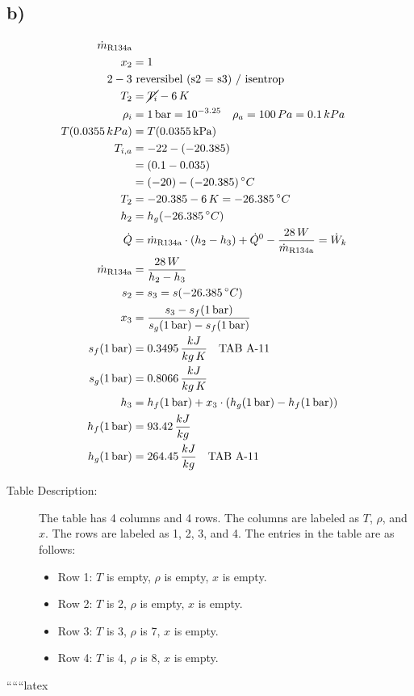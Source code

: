 

\subsection*{b)}

\begin{align*}
    \dot{m}_{\text{R134a}} \\
    x_2 &= 1 \\
    2-3 &\text{ reversibel (s2 = s3) / isentrop} \\
    T_2 &= \cancel{T_i} - 6\,K \\
    \rho_i &= 1\,\text{bar} = 10^{-3.25} \quad \rho_a = 100\,Pa = 0.1\,kPa \\
    T(0.0355\,kPa) &= T(0.0355\,\text{kPa}) \\
    T_{i,a} &= -22 - (-20.385) \\
    &= (0.1 - 0.035) \\
    &= (-20) - (-20.385)\,^\circ C \\
    T_2 &= -20.385 - 6\,K = -26.385\,^\circ C \\
    h_2 &= h_g(-26.385\,^\circ C) \\
    \dot{Q} &= \dot{m}_{\text{R134a}} \cdot (h_2 - h_3) + \dot{Q}^0 - \frac{28\,W}{\dot{m}_{\text{R134a}}} = \dot{W}_k \\
    \dot{m}_{\text{R134a}} &= \frac{28\,W}{h_2 - h_3} \\
    s_2 &= s_3 = s(-26.385\,^\circ C) \\
    x_3 &= \frac{s_3 - s_f(1\,\text{bar})}{s_g(1\,\text{bar}) - s_f(1\,\text{bar})} \\
    s_f(1\,\text{bar}) &= 0.3495\,\frac{kJ}{kg\,K} \quad \text{TAB A-11} \\
    s_g(1\,\text{bar}) &= 0.8066\,\frac{kJ}{kg\,K} \\
    h_3 &= h_f(1\,\text{bar}) + x_3 \cdot \left( h_g(1\,\text{bar}) - h_f(1\,\text{bar}) \right) \\
    h_f(1\,\text{bar}) &= 93.42\,\frac{kJ}{kg} \\
    h_g(1\,\text{bar}) &= 264.45\,\frac{kJ}{kg} \quad \text{TAB A-11}
\end{align*}

\begin{description}
    \item[Table Description:] The table has 4 columns and 4 rows. The columns are labeled as $T$, $\rho$, and $x$. The rows are labeled as 1, 2, 3, and 4. The entries in the table are as follows:
    \begin{itemize}
        \item Row 1: $T$ is empty, $\rho$ is empty, $x$ is empty.
        \item Row 2: $T$ is 2, $\rho$ is empty, $x$ is empty.
        \item Row 3: $T$ is 3, $\rho$ is 7, $x$ is empty.
        \item Row 4: $T$ is 4, $\rho$ is 8, $x$ is empty.
    \end{itemize}
\end{description}

``````latex